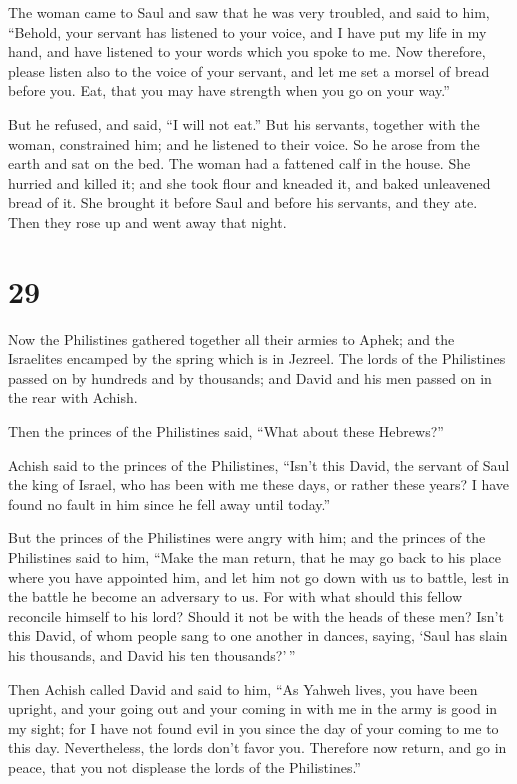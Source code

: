  The woman came to Saul and saw that he was very troubled,
and said to him, ``Behold, your servant has listened to your voice, and
I have put my life in my hand, and have listened to your words which you
spoke to me.  Now therefore, please listen also to the
voice of your servant, and let me set a morsel of bread before you. Eat,
that you may have strength when you go on your way.''

 But he refused, and said, ``I will not eat.'' But his
servants, together with the woman, constrained him; and he listened to
their voice. So he arose from the earth and sat on the bed.
 The woman had a fattened calf in the house. She hurried
and killed it; and she took flour and kneaded it, and baked unleavened
bread of it.  She brought it before Saul and before his
servants, and they ate. Then they rose up and went away that night.

\hypertarget{section-28}{%
\section{29}\label{section-28}}

 Now the Philistines gathered together all their armies to
Aphek; and the Israelites encamped by the spring which is in Jezreel.
 The lords of the Philistines passed on by hundreds and by
thousands; and David and his men passed on in the rear with Achish.

 Then the princes of the Philistines said, ``What about
these Hebrews?''

Achish said to the princes of the Philistines, ``Isn't this David, the
servant of Saul the king of Israel, who has been with me these days, or
rather these years? I have found no fault in him since he fell away
until today.''

 But the princes of the Philistines were angry with him; and
the princes of the Philistines said to him, ``Make the man return, that
he may go back to his place where you have appointed him, and let him
not go down with us to battle, lest in the battle he become an adversary
to us. For with what should this fellow reconcile himself to his lord?
Should it not be with the heads of these men?  Isn't this
David, of whom people sang to one another in dances, saying, `Saul has
slain his thousands, and David his ten thousands?'\,''

 Then Achish called David and said to him, ``As Yahweh
lives, you have been upright, and your going out and your coming in with
me in the army is good in my sight; for I have not found evil in you
since the day of your coming to me to this day. Nevertheless, the lords
don't favor you.  Therefore now return, and go in peace,
that you not displease the lords of the Philistines.''

